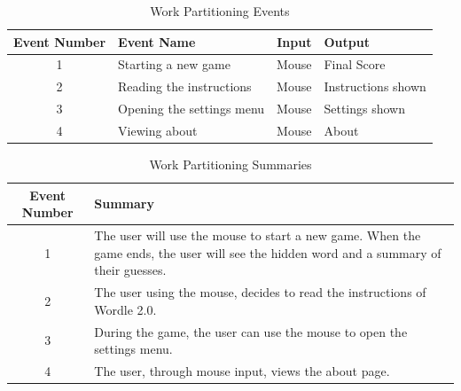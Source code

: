 \documentclass[12pt, titlepage]{article}
\begin{document}
	\begin{table}[h!]
		\caption{Work Partitioning Events}
		\centering
		\begin{tabular}{|c|p{3.5cm}|c|p{3.5cm}|}
			\hline
			\textbf{Event Number} & \centering\textbf{Event Name} & 
			\textbf{Input} 
			& \textbf{Output} \\
			\hline
			1 & Starting a new game & Mouse & Final Score \\
			\hline
			2 & Reading the instructions  & Mouse & Instructions shown \\
			\hline
			3 & Opening the settings menu & Mouse & Settings shown \\
			\hline
			4 & Viewing about & Mouse & About \\
			\hline
		\end{tabular}
	\end{table}
	\begin{table}[h]
		\caption{Work Partitioning Summaries}
		\centering
		\begin{tabular}{|c|p{11cm}|}
			\hline
			\textbf{Event Number} & \textbf{Summary} \\
			\hline
			1 & The user will use the mouse to start a 
			new game. When the game ends, the user will see the hidden word 
			and a summary of their guesses. \\
			\hline
			2 & The user using the mouse, decides to read the instructions of 
			Wordle 2.0. \\
			\hline
			3 & During the game, the user can use the mouse to open the 
			settings 
			menu. \\
			\hline
			4 &  The user, through mouse input, views the about page.\\
			\hline
		\end{tabular}
	\end{table}
	\newpage
	
\end{document}
